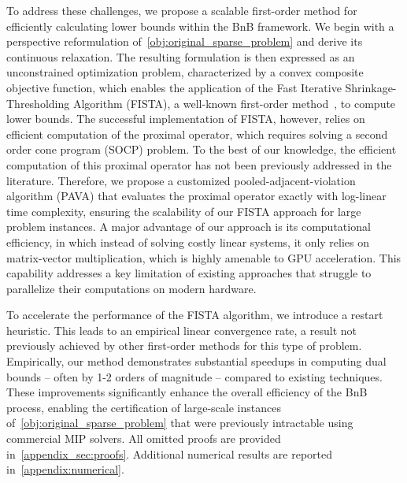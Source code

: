 To address these challenges, we propose a scalable first-order method for efficiently calculating lower bounds within the BnB framework.
We begin with a perspective reformulation of~\eqref{obj:original_sparse_problem} and derive its continuous relaxation.
The resulting formulation is then expressed as an unconstrained optimization problem, characterized by a convex composite objective function, which enables the application of the Fast Iterative Shrinkage-Thresholding Algorithm (FISTA), a well-known first-order method~\citep{beck2009fast}, to compute lower bounds.
The successful implementation of FISTA, however, relies on efficient computation of the proximal operator, which requires solving a second order cone program (SOCP) problem.
To the best of our knowledge, the efficient computation of this proximal operator has not been previously addressed in the literature. 
Therefore, we propose a customized pooled-adjacent-violation algorithm (PAVA) that evaluates the proximal operator exactly with log-linear time complexity, ensuring the scalability of our FISTA approach for large problem instances.
A major advantage of our approach is its computational efficiency, in which instead of solving costly linear systems, it only relies on matrix-vector multiplication, which is highly amenable to GPU acceleration.
This capability addresses a key limitation of existing approaches that struggle to parallelize their computations on modern hardware.

To accelerate the performance of the FISTA algorithm, we introduce a restart heuristic. 
This leads to an empirical linear convergence rate, a result not previously achieved by other first-order methods for this type of problem.
Empirically, our method demonstrates substantial speedups in computing dual bounds -- often by 1-2 orders of magnitude -- compared to existing techniques. 
These improvements significantly enhance the overall efficiency of the BnB process, enabling the certification of large-scale instances of~\eqref{obj:original_sparse_problem} that were previously intractable using commercial MIP solvers. All omitted proofs are provided in~\ref{appendix_sec:proofs}. Additional numerical results are reported in~\ref{appendix:numerical}.

